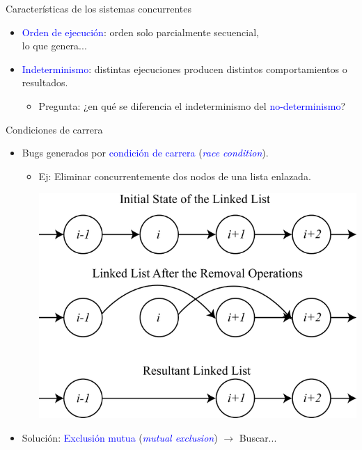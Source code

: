 \documentclass[handout]{beamer} %
\newcommand{\blue}[1]{\textcolor{blue}{#1}}
\begin{document}
\begin{frame}{Características de los sistemas concurrentes}
    \begin{itemize}
        \item<1-> \blue{Orden de ejecución}: orden solo parcialmente secuencial,\\lo que genera...
        \item<1-> \blue{Indeterminismo}: distintas ejecuciones producen distintos comportamientos o resultados.
        \begin{itemize}
            \item<2-> Pregunta: ¿en qué se diferencia el indeterminismo del \blue{no-determinismo}?
        \end{itemize}
    \end{itemize}
\end{frame}

\begin{frame}{Condiciones de carrera}
    \begin{itemize}
        \item<1-> Bugs generados por \blue{condición de carrera} (\blue{\em race condition}).
        \begin{itemize}
            \item<2-> Ej: Eliminar concurrentemente dos nodos de una lista enlazada.
            \medskip
            
            \begin{center}
              \includegraphics[width=.6\textwidth]{./image/cap7/mutual-exclusion.png}
            \end{center}
            \smallskip
        \end{itemize}
        \item<3-> Solución: \blue{Exclusión mutua} (\blue{\em mutual exclusion}) $\to$ Buscar...
    \end{itemize}
\end{frame}
\end{document}
